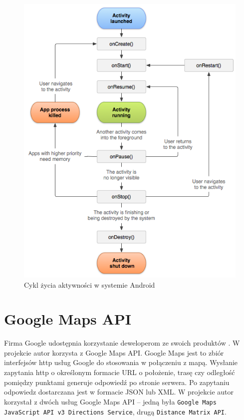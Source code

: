 \documentclass[eng,printmode,oneside]{mgr}
\begin{document}
\begin{figure}[ht!]
\centering
\includegraphics[width=80ex]{andActivityLifecycle.png}
\caption{Cykl życia aktywności w systemie Android \cite{developer.android}}
\label{fig:andActivityLifecycle}
\end{figure}

\section{Google Maps API}

Firma Google udostępnia korzystanie deweloperom ze swoich produktów
\cite{developer.google}. W projekcie autor korzysta z Google Maps API. Google
Maps jest to zbiór interfejsów http usług Google do stosowania w połączeniu z
mapą. Wysłanie zapytania http o określonym formacie URL o położenie, trasę czy
odległość pomiędzy punktami generuje odpowiedź po stronie serwera. Po zapytaniu
odpowiedz dostarczana jest w formacie JSON lub XML. W projekcie autor korzystał z dwóch
usług Google Maps API -- jedną była \texttt{Google Maps JavaScript API v3
Directions Service}, drugą \texttt{Distance Matrix API}.
\end{document}
